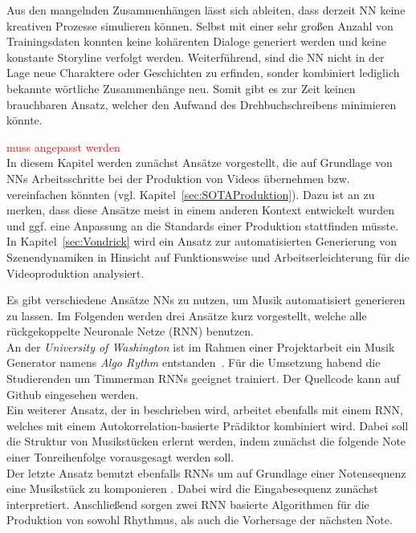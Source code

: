 \documentclass[times, 11pt,twocolumn]{article}
\begin{document}
Aus den mangelnden Zusammenhängen lässt sich ableiten, dass derzeit NN keine kreativen Prozesse simulieren können. Selbst mit einer sehr großen Anzahl von Trainingsdaten konnten keine kohärenten Dialoge generiert werden und keine konstante Storyline verfolgt werden. Weiterführend, sind die NN nicht in der Lage neue Charaktere oder Geschichten zu erfinden, sonder kombiniert lediglich bekannte wörtliche Zusammenhänge neu. Somit gibt es zur Zeit keinen brauchbaren Ansatz, welcher den Aufwand des Drehbuchschreibens minimieren könnte. 

 \label{sec:Produktion}
\textcolor{red}{muss angepasst werden} \\
In diesem Kapitel werden zunächst Ansätze vorgestellt, die auf Grundlage von NNs Arbeitsschritte bei der Produktion von Videos übernehmen bzw. vereinfachen könnten (vgl. Kapitel~\ref{sec:SOTAProduktion}). Dazu ist an zu merken, dass diese Ansätze meist in einem anderen Kontext entwickelt wurden und ggf. eine Anpassung an die Standards einer Produktion stattfinden müsste. \\

In Kapitel~\ref{sec:Vondrick} wird ein Ansatz zur automatisierten Generierung von Szenendynamiken in Hinsicht auf Funktionsweise und Arbeitserleichterung für die Videoproduktion analysiert. 


 \label{sec:SOTAProduktion}
Es gibt verschiedene Ansätze NNs zu nutzen, um Musik automatisiert generieren zu lassen. Im Folgenden werden drei Ansätze kurz vorgestellt, welche alle rückgekoppelte Neuronale Netze (RNN) benutzen. \\
An der \textit{University of Washington} ist im Rahmen einer Projektarbeit ein Musik Generator namens \textit{Algo Rythm} entstanden~\cite{Algorithm}. Für die Umsetzung habend die Studierenden um Timmerman RNNs geeignet trainiert. Der Quellcode kann auf Github \cite{AlgorithmGit} eingesehen werden.\\
Ein weiterer Ansatz, der in \cite{eck+lapalme:2008} beschrieben wird, arbeitet ebenfalls mit einem RNN, welches mit einem Autokorrelation-basierte Prädiktor kombiniert wird. Dabei soll die Struktur von Musikstücken erlernt werden, indem zunächst die folgende Note einer Tonreihenfolge vorausgesagt werden soll. \\
Der letzte Ansatz benutzt ebenfalls RNNs um auf Grundlage einer Notensequenz eine Musikstück zu komponieren \cite{browne2001system}. Dabei wird die Eingabesequenz zunächst interpretiert. Anschließend sorgen zwei RNN basierte Algorithmen für die Produktion von sowohl Rhythmus, als auch die Vorhersage der nächsten Note. \\
\end{document}
